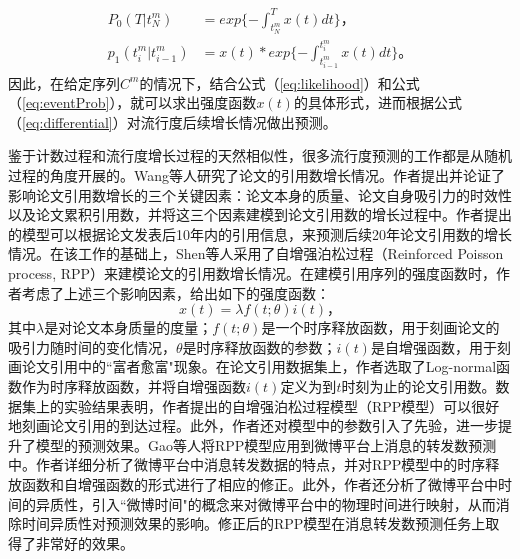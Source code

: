 \begin{eqnarray}
\label{eq:eventProb}
\begin{split}
P_0(T|t_N^m) & =exp\{-\int_{t_N^m}^T x(t)dt\}\text{，}\\
p_1(t_i^m|t_{i-1}^m) & =x(t)\ast exp\{-\int_{t_{i-1}^m}^{t_i^m} x(t)dt\}\text{。}
\end{split}
\end{eqnarray}
因此，在给定序列$C^m$的情况下，结合公式（\ref{eq:likelihood}）和公式（\ref{eq:eventProb}），就可以求出强度函数$x(t)$的具体形式，进而根据公式（\ref{eq:differential}）对流行度后续增长情况做出预测。

鉴于计数过程和流行度增长过程的天然相似性，很多流行度预测的工作都是从随机过程的角度开展的。Wang等人\citep{wang2013quantifying}研究了论文的引用数增长情况。作者提出并论证了影响论文引用数增长的三个关键因素：论文本身的质量、论文自身吸引力的时效性以及论文累积引用数，并将这三个因素建模到论文引用数的增长过程中。作者提出的模型可以根据论文发表后10年内的引用信息，来预测后续20年论文引用数的增长情况。在该工作的基础上，Shen等人\citep{shen2014modeling}采用了自增强泊松过程（Reinforced Poisson process, RPP）\citep{pemantle2007survey}来建模论文的引用数增长情况。在建模引用序列的强度函数时，作者考虑了上述三个影响因素，给出如下的强度函数：
\begin{equation}
\label{eq:intensityRPP}
x(t)=\lambda f(t;\theta)i(t)\text{，}
\end{equation}
其中$\lambda$是对论文本身质量的度量；$f(t;\theta)$是一个时序释放函数，用于刻画论文的吸引力随时间的变化情况，$\theta$是时序释放函数的参数；$i(t)$是自增强函数，用于刻画论文引用中的``富者愈富"现象。在论文引用数据集上，作者选取了Log-normal函数作为时序释放函数，并将自增强函数$i(t)$定义为到$t$时刻为止的论文引用数。数据集上的实验结果表明，作者提出的自增强泊松过程模型（RPP模型）可以很好地刻画论文引用的到达过程。此外，作者还对模型中的参数引入了先验，进一步提升了模型的预测效果。Gao等人\citep{gao2015modeling}将RPP模型应用到微博平台上消息的转发数预测中。作者详细分析了微博平台中消息转发数据的特点，并对RPP模型中的时序释放函数和自增强函数的形式进行了相应的修正。此外，作者还分析了微博平台中时间的异质性，引入``微博时间"的概念来对微博平台中的物理时间进行映射，从而消除时间异质性对预测效果的影响。修正后的RPP模型在消息转发数预测任务上取得了非常好的效果。

